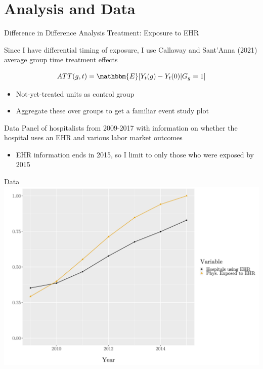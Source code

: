 \documentclass[10pt]{beamer}
\begin{document}
\section{Analysis and Data}




\begin{frame}{Difference in Difference Analysis}
Treatment: Exposure to EHR

\vspace{3mm}

Since I have differential timing of exposure, I use Callaway and Sant'Anna (2021) average group time treatment effects

$$ATT(g,t)=\mathbbm{E}[Y_t(g)-Y_t(0)|G_g=1]$$

\vspace{3mm}

\begin{itemize}
\item Not-yet-treated units as control group
    \item Aggregate these over groups to get a familiar event study plot
\end{itemize}
\end{frame}



\begin{frame}{Data}
Panel of hospitalists from 2009-2017 with information on whether the hospital uses an EHR and various labor market outcomes

\vspace{4mm}
\pause
\begin{itemize}
    \item EHR information ends in 2015, so I limit to only those who were exposed by 2015
\end{itemize}
\end{frame}

\begin{frame}{Data}
    \centering
    \includegraphics[scale=.4]{Objects/sum_stats_year.pdf}
\end{frame}
\end{document}
